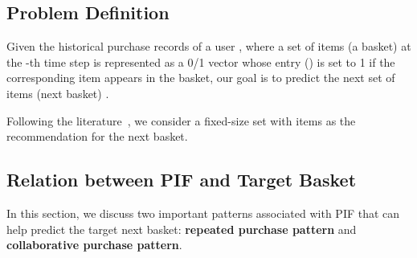 \documentclass[sigconf]{acmart}
\begin{document}
\subsection{Problem Definition} 

Given the historical  purchase records of a user , where a  set of items (a basket) at the -th time step is represented as a 0/1 vector  whose entry  () is set to 1 if the  corresponding item  appears in the  basket, our  goal is to predict the next set of items (next basket)  . 

Following the  literature~\cite{rendle2010factorizing}\cite{yu2016dynamic}, we consider a  fixed-size set with  items as the  recommendation for the next basket.




\subsection{Relation between PIF and Target Basket}
\label{sec:analysis_freq}

In this section, we discuss two important patterns  associated with PIF that can help predict the  target next basket: \textbf{repeated purchase pattern} and \textbf{collaborative purchase pattern}. 
\end{document}
